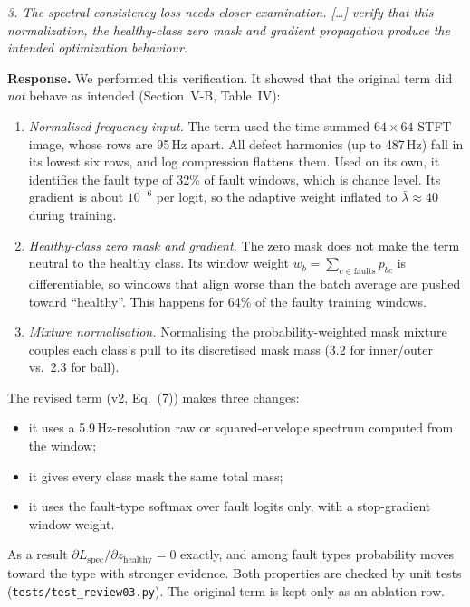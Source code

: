 \documentclass[11pt]{article}
\newcommand{\Lspec}{L_{\mathrm{spec}}}
\newenvironment{comment}{\par\medskip\noindent\begin{minipage}{\linewidth}\itshape\color{black!70}}{\end{minipage}\par\smallskip}
\begin{document}
\begin{comment}
3. The spectral-consistency loss needs closer examination. [\dots] verify that
this normalization, the healthy-class zero mask and gradient propagation produce
the intended optimization behaviour.
\end{comment}
\textbf{Response.} We performed this verification. It showed that the original
term did \emph{not} behave as intended (Section~V-B, Table~IV):
\begin{enumerate}[leftmargin=*]
\item \emph{Normalised frequency input.} The term used the time-summed $64\times64$
STFT image, whose rows are 95\,Hz apart. All defect harmonics (up to 487\,Hz)
fall in its lowest six rows, and log compression flattens them. Used on its own,
it identifies the fault type of 32\% of fault windows, which is chance level. Its
gradient is about $10^{-6}$ per logit, so the adaptive weight inflated to
$\bar\lambda\approx40$ during training.
\item \emph{Healthy-class zero mask and gradient.} The zero mask does not make the
term neutral to the healthy class. Its window weight
$w_b=\sum_{c\in\text{faults}}p_{bc}$ is differentiable, so windows that align
worse than the batch average are pushed toward ``healthy''. This happens for
64\% of the faulty training windows.
\item \emph{Mixture normalisation.} Normalising the probability-weighted mask
mixture couples each class's pull to its discretised mask mass (3.2 for
inner/outer vs.\ 2.3 for ball).
\end{enumerate}
The revised term (v2, Eq.~(7)) makes three changes:
\begin{itemize}[leftmargin=*]
\item it uses a 5.9\,Hz-resolution raw or squared-envelope spectrum computed from the window;
\item it gives every class mask the same total mass;
\item it uses the fault-type softmax over fault logits only, with a stop-gradient window weight.
\end{itemize}
As a result $\partial\Lspec/\partial z_{\mathrm{healthy}}=0$ exactly, and among
fault types probability moves toward the type with stronger evidence. Both
properties are checked by unit tests (\texttt{tests/test\_review03.py}). The
original term is kept only as an ablation row.
\end{document}

